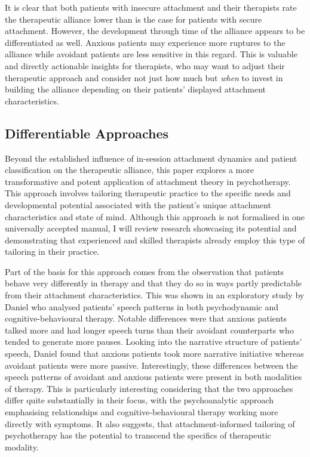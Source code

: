 \documentclass[12pt]{report}
\begin{document}
It is clear that both patients with insecure attachment and their therapists rate the therapeutic alliance lower than is the case for patients with secure attachment.
However, the development through time of the alliance appears to be differentiated as well. Anxious patients may experience more ruptures to the alliance while avoidant patients are less sensitive in this regard.
This is valuable and directly actionable insights for therapists, who may want to adjust their therapeutic approach and consider not just how much but \textit{when} to invest in building the alliance depending on their patients' displayed attachment characteristics.

\subsection{Differentiable Approaches}
\label{sec:Differentiable approaches}
Beyond the established influence of in-session attachment dynamics and patient classification on the therapeutic alliance, this paper explores a more transformative and potent application of attachment theory in psychotherapy.
This approach involves tailoring therapeutic practice to the specific needs and developmental potential associated with the patient's unique attachment characteristics and state of mind.
Although this approach is not formalised in one universally accepted manual, I will review research showcasing its potential and demonstrating that experienced and skilled therapists already employ this type of tailoring in their practice.

Part of the basis for this approach comes from the observation that patients behave very differently in therapy and that they do so in ways partly predictable from their attachment characteristics.
This was shown in an exploratory study by Daniel \citeyear{Daniel2011} who analysed patients' speech patterns in both psychodynamic and cognitive-behavioural therapy.
Notable differences were that anxious patients talked more and had longer speech turns than their avoidant counterparts who tended to generate more pauses.
Looking into the narrative structure of patients' speech, Daniel found that anxious patients took more narrative initiative whereas avoidant patients were more passive.
Interestingly, these differences between the speech patterns of avoidant and anxious patients were present in both modalities of therapy. This is particularly interesting considering that the two approaches differ quite substantially in their focus, with the psychoanalytic approach emphasising relationships and cognitive-behavioural therapy working more directly with symptoms.
It also suggests, that attachment-informed tailoring of psychotherapy has the potential to transcend the specifics of therapeutic modality.
\end{document}
